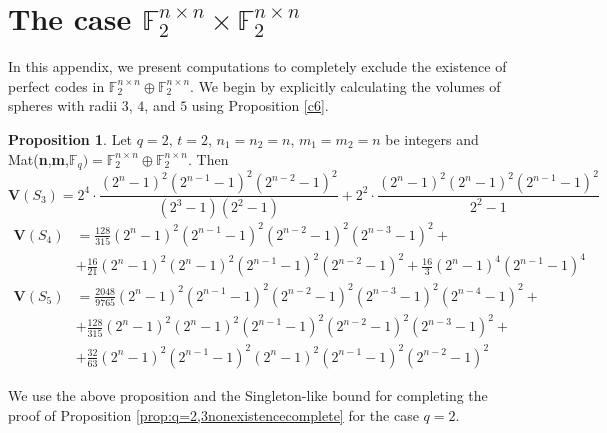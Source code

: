 \documentclass[11pt]{amsart}
\theoremstyle{definition}
\newtheorem{proposition}[theorem]{Proposition}
\begin{document}
\section{The case \texorpdfstring{$\mathbb{F}_2^{n\times n}\times \mathbb{F}_2^{n\times n}$}{F2(n×n) × F2(n×n)}}\label{app}

In this appendix, we present computations to completely exclude the existence of perfect codes in $\mathbb{F}_2^{n \times n} \oplus \mathbb{F}_2^{n \times n}$. We begin by explicitly calculating the volumes of spheres with radii $3$, $4$, and $5$ using Proposition \ref{c6}.

\begin{proposition}
Let $q=2$, $t=2$, $n_1=n_2=n$, $m_1=m_2=n$ be integers and Mat(\textbf{n},\textbf{m},$\mathbb{F}_q)=\mathbb{F}_2^{n\times n}\oplus \mathbb{F}_2^{n\times n}$. Then
\begin{equation}\label{S_3}
\textbf{V}(S_3)=2^4\cdot\frac{(2^n-1)^2(2^{n-1}-1)^2(2^{n-2}-1)^2}{(2^3-1)(2^2-1)}+2^2\cdot\frac{(2^n-1)^2(2^n-1)^2(2^{n-1}-1)^2}{2^2-1}
\end{equation}
\begin{equation}\label{S_4}
	\begin{aligned}
\textbf{V}(S_4)&=\frac{128}{315}(2^n-1)^2(2^{n-1}-1)^2(2^{n-2}-1)^2(2^{n-3}-1)^2+\\&+\frac{16}{21}(2^n-1)^2(2^n-1)^2(2^{n-1}-1)^2(2^{n-2}-1)^2+\frac{16}{3}(2^n-1)^4(2^{n-1}-1)^4
\end{aligned}
\end{equation}
\begin{equation}\label{S_5}
\begin{aligned}
\textbf{V}(S_5)&=\frac{2048}{9765}(2^n-1)^2(2^{n-1}-1)^2(2^{n-2}-1)^2(2^{n-3}-1)^2(2^{n-4}-1)^2+\\&+\frac{128}{315}(2^n-1)^2(2^n-1)^2(2^{n-1}-1)^2(2^{n-2}-1)^2(2^{n-3}-1)^2+\\&+\frac{32}{63}(2^n-1)^2(2^{n-1}-1)^2(2^n-1)^2(2^{n-1}-1)^2(2^{n-2}-1)^2
\end{aligned}
\end{equation}
\end{proposition}

We use the above proposition and the Singleton-like bound for completing the proof of Proposition \ref{prop:q=2,3nonexistencecomplete} for the case $q=2$.
\end{document}
